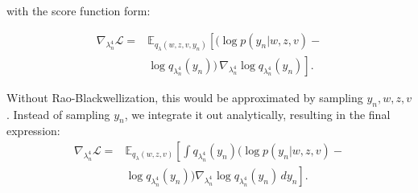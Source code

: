 \documentclass{article}
\begin{document}
\begin{multicols}{2}
    with the score function form:

    \begin{align*}
        \nabla_{\lambda_n^4}\mathcal{L} =& \mathbb{E}_{q_\lambda(w,z,v,y_n)}\left[(\log p(y_n|w,z,v)-\right.\\&\left.\log q_{\lambda_n^4}(y_n))\,\nabla_{\lambda_n^4}\log q_{\lambda_n^4}(y_n)\right].
    \end{align*}

    Without Rao-Blackwellization, this would be approximated by sampling $y_n, w,z,v$.
    Instead of sampling $y_n$, we integrate it out analytically, resulting in the final expression:
    \begin{align*}
        \nabla_{\lambda_n^4}\mathcal{L} 
        =& \mathbb{E}_{q_\lambda(w,z,v)}\left[\int q_{\lambda_n^4}(y_n) (\log p(y_n|w,z,v)-\right.\\&\left.\log q_{\lambda_n^4}(y_n)) \nabla_{\lambda_n^4}\log q_{\lambda_n^4}(y_n)\,dy_n\right].
    \end{align*}




\end{multicols}

\clearpage
{}
\printbibliography{}
\end{document}
